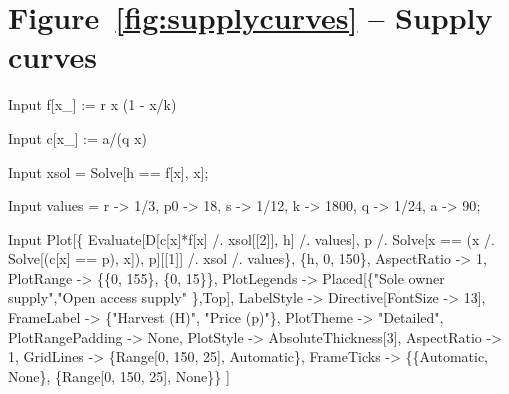 \documentclass[11pt,fleqn]{book} %
\begin{document}
\section*{Figure~\ref{fig:supplycurves} -- Supply curves }
\small{
\begin{mmaCell}[index=1]{Input}
   f[x_] := r x (1 - x/k)
\end{mmaCell}

\begin{mmaCell}{Input}
   c[x_] := a/(q x)
\end{mmaCell}

\begin{mmaCell}{Input}
   xsol = Solve[h == f[x], x];
\end{mmaCell}

\begin{mmaCell}{Input}
   values = {r -> 1/3, p0 -> 18, s -> 1/12, k -> 1800, q -> 1/24, a -> 90};
\end{mmaCell}

\begin{mmaCell}{Input}
   Plot[\{
     Evaluate[D[c[x]*f[x] /. xsol[[2]], h] /. values],
     p /. Solve[x == (x /. Solve[(c[x] == p), x]), p][[1]] /. xsol /. values\}, 
     \{h, 0, 150\}, 
     AspectRatio -> 1, 
     PlotRange        -> \{\{0, 155\}, \{0, 15\}\},
     PlotLegends      -> Placed[\{"Sole owner supply","Open access supply" \},Top], 
     LabelStyle       -> Directive[FontSize -> 13], 
     FrameLabel       -> \{"Harvest (H)", "Price (p)"\}, 
     PlotTheme        -> "Detailed", 
     PlotRangePadding -> None, 
     PlotStyle        -> AbsoluteThickness[3], 
     AspectRatio      -> 1, 
     GridLines        -> \{Range[0, 150, 25], Automatic\}, 
     FrameTicks       -> \{\{Automatic, None\}, \{Range[0, 150, 25], None\}\}
   ]
\end{mmaCell}
}

\end{document}
